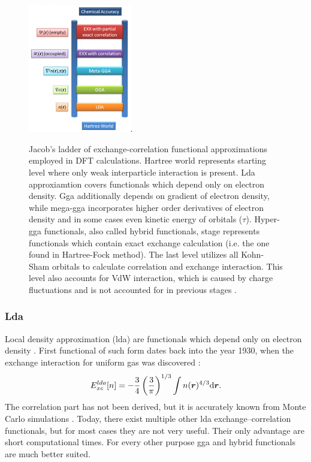 \documentclass[openany, longbibliography,slovene,a4paper,12pt]{article}
\def\vec#1{\mbox{\boldmath$#1$}}
\newcommand{\dif}{\mathrm{d}}
\begin{document}
\begin{figure}[!ht]
  \centering
  \includegraphics[width=0.4\textwidth]{jacobs_functional_ladder_ver2.png}.
  \caption{Jacob’s ladder of exchange-correlation functional approximations
    employed in DFT calculations. Hartree world represents starting level where only
    weak interparticle interaction is present. Lda approxiamtion covers
    functionals which depend only on electron density. Gga additionally depends
    on gradient of electron density, while mega-gga incorporates higher order
    derivatives of electron density and in some cases even kinetic energy of
    orbitals ($\tau$). Hyper-gga functionals, also called hybrid functionals,
    stage represents functionals which contain exact exchange calculation (i.e.
    the one found in Hartree-Fock method). The last level utilizes all Kohn-Sham
    orbitals to calculate correlation and exchange interaction. This level also
    accounts for VdW interaction, which is caused by charge fluctuations and is
    not accounted for in previous stages \cite{How_theo_simul_can_address}.
  }
  \label{ladder}
\end{figure}

\subsubsection{Lda}
Local density approximation (lda) are functionals which depend only on
 electron density \cite{challenges_den_fun_theor, presc_desig_selec_densit_funct_approx}.
First functional of such form dates back into
the year 1930, when the exchange interaction for uniform gas was discovered
\cite{challenges_den_fun_theor} :
\begin{equation} \label{electron_gas_exchange}
E_{xc}^{lda}[n]=-\frac{3}{4}\left( \frac{3}{\pi} \right)^{1/3}\int n(\vec r)^{4/3} \dif \vec r.
\end{equation}
The correlation part has not been derived, but it is accurately known from Monte
Carlo simulations \cite{presc_desig_selec_densit_funct_approx}.
Today, there exist multiple other lda exchange--correlation functionals, but for most cases
they are not very useful. Their only advantage are short computational times.
For every other purpose gga and hybrid functionals are much better suited.
\end{document}
